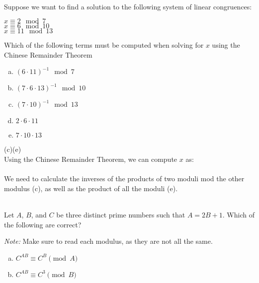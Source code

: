 \begin{solution}
\begin{enumerate}[(a)]
\begin{solution}
\end{solution}
\\
Suppose we want to find a solution to the following system of linear congruences:
\begin{center}
$x \equiv 2 \mod{7}$\\
$x \equiv 6 \mod{10}$\\
$x \equiv 11 \mod{13}$\\
\end{center}
Which of the following terms must be computed when solving for $x$ using the Chinese Remainder Theorem
\begin{enumerate}[(a)]
	\item  $(6 \cdot 11)^{-1} \mod{7}$

	\item  $(7 \cdot 6 \cdot 13)^{-1} \mod{10}$

	\item  $(7 \cdot 10)^{-1} \mod{13}$

	\item  $2 \cdot 6 \cdot 11$

	\item  $7 \cdot 10 \cdot 13$

\end{enumerate}
\begin{solution}

(c)(e)\\
Using the Chinese Remainder Theorem, we can compute $x$ as:\\
\\
We need to calculate the inverses of the products of two moduli mod the other modulus (c), as well as the product of all the moduli (e).

\end{solution}
\\
Let $A$, $B$, and $C$ be three distinct prime numbers such that $A=2B+1$. Which of the following are correct?  

\textit{Note:} Make sure to read each modulus, as they are not all the same.
\begin{enumerate}[(a)]
	\item  $C^{AB}\equiv C^B\pmod{A}$

	\item  $C^{AB}\equiv C^3\pmod{B}$


\end{enumerate}
\end{enumerate}
\end{solution}
